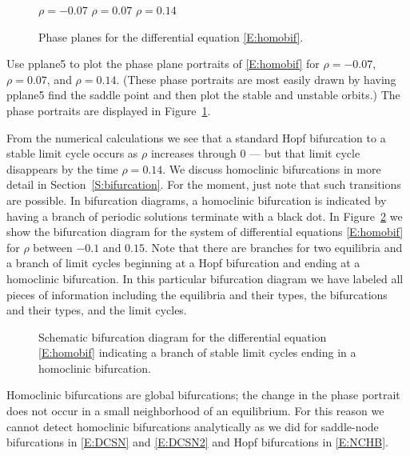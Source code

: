 \documentclass{ximera}
\begin{document}
\begin{figure}[htb]
           \centerline{%
           }
		\vspace*{-0.2in}		
	$\rho=-0.07$ \hspace{1.8in} $\rho=0.07$ 
		\hspace{1.8in} $\rho=0.14$
	  \caption{Phase planes for the differential equation 
	\protect\eqref{E:homobif}. }
           \label{F:homobif}
\end{figure}

Use {\sf pplane5} to plot the phase plane portraits of \eqref{E:homobif}
for $\rho=-0.07$, $\rho=0.07$, and $\rho=0.14$.  (These phase portraits 
are most easily drawn by having {\sf pplane5} find the saddle point and
then plot the stable and unstable orbits.)  The phase portraits are 
displayed in Figure~\ref{F:homobif}.  

From the numerical calculations we see that a standard Hopf bifurcation 
to a stable limit cycle occurs as $\rho$ 
increases through $0$ --- but that limit cycle disappears by the
time $\rho=0.14$.   We discuss homoclinic bifurcations in more detail 
in Section~\ref{S:bifurcation}.  For the moment, just note that such 
transitions are possible.  In bifurcation diagrams, a homoclinic 
bifurcation  is indicated by having a branch of periodic solutions
terminate with a black dot.  In Figure~\ref{F:homobifdiag} we show the 
bifurcation diagram for the system of differential equations 
\eqref{E:homobif} for $\rho$ between $-0.1$ and $0.15$.  Note that there
are branches for two equilibria and a 
branch of limit cycles 
beginning at a Hopf bifurcation and ending at a homoclinic bifurcation.
In this particular bifurcation diagram we have labeled all pieces
of information including the equilibria and their types, the 
bifurcations and their types, and the limit cycles.


\begin{figure}[htb]
           \centerline{%
           }
  \caption{Schematic bifurcation diagram for the differential equation
    \protect\eqref{E:homobif} indicating a branch of stable limit cycles
        ending in a homoclinic bifurcation.}
           \label{F:homobifdiag}
\end{figure}

Homoclinic bifurcations are global bifurcations; the change in the phase 
portrait does not occur in a small neighborhood of an equilibrium.  For 
this reason we cannot detect homoclinic bifurcations analytically as we 
did for saddle-node bifurcations in \eqref{E:DCSN} and \eqref{E:DCSN2} and Hopf bifurcations in \eqref{E:NCHB}.
\end{document}
